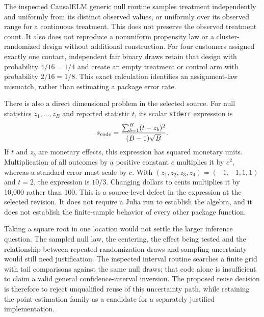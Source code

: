 The inspected CausalELM generic null routine samples treatment independently
and uniformly from its distinct observed values, or uniformly over its
observed range for a continuous treatment. This does not preserve the
observed treatment count. It also does not reproduce a nonuniform propensity
law or a cluster-randomized design without additional construction. For four
customers assigned exactly one contact, independent fair binary draws retain
that design with probability $4/16=1/4$ and create an empty treatment or
control arm with probability $2/16=1/8$. This exact calculation identifies an
assignment-law mismatch, rather than estimating a package error rate.
\cite{exec21_effects_causalelm,exec21_effects_reference}

There is also a direct dimensional problem in the selected source. For null
statistics $z_1,\ldots,z_B$ and reported statistic $t$, its scalar
\texttt{stderr} expression is
\begin{equation}
\label{exec21:effects-scale}
 s_{\rm code}=\frac{\sum_{b=1}^{B}(t-z_b)^2}{(B-1)\sqrt B}.
\end{equation}
If $t$ and $z_b$ are monetary effects, this expression has squared monetary
units. Multiplication of all outcomes by a positive constant $c$ multiplies
it by $c^2$, whereas a standard error must scale by $c$. With
$(z_1,z_2,z_3,z_4)=(-1,-1,1,1)$ and $t=2$, the expression is $10/3$.
Changing dollars to cents multiplies it by 10,000 rather than 100. This is a
source-level defect in the expression at the selected revision. It does not
require a Julia run to establish the algebra, and it does not establish the
finite-sample behavior of every other package function.
\cite{exec21_effects_causalelm,exec21_effects_reference}

Taking a square root in one location would not settle the larger inference
question. The sampled null law, the centering, the effect being tested and
the relationship between repeated randomization draws and sampling
uncertainty would still need justification. The inspected interval routine
searches a finite grid with tail comparisons against the same null draws;
that code alone is insufficient to claim a valid general confidence-interval
inversion. The proposed reuse decision is therefore to reject unqualified
reuse of this uncertainty path, while retaining the point-estimation family
as a candidate for a separately justified implementation.
\cite{exec21_effects_causalelm}

